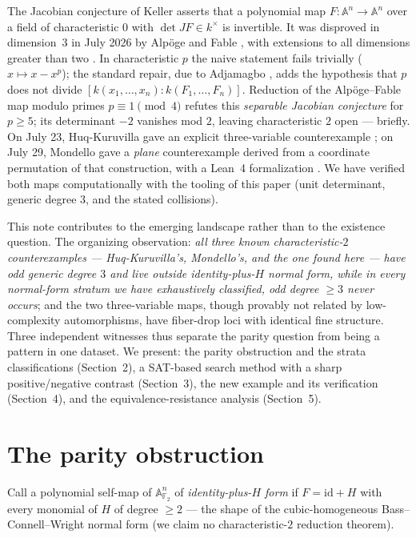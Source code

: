 \documentclass[11pt]{amsart}
\newcommand{\F}{\mathbb{F}}
\newcommand{\A}{\mathbb{A}}
\begin{document}
The Jacobian conjecture of Keller asserts that a polynomial map
$F\colon\A^n \to \A^n$ over a field of characteristic $0$ with
$\det JF \in k^\times$ is invertible. It was disproved in dimension~$3$
in July 2026 by Alp\"oge and Fable \cite{alpoge,sbs,tao}, with
extensions to all dimensions greater than two \cite{dims}. In
characteristic $p$ the naive statement fails trivially
($x \mapsto x - x^p$); the standard repair, due to Adjamagbo
\cite{adjamagbo}, adds the hypothesis that $p$ does not divide
$[k(x_1,\dots,x_n) : k(F_1,\dots,F_n)]$. Reduction of the
Alp\"oge--Fable map modulo primes $p \equiv 1 \pmod 4$ refutes this
\emph{separable Jacobian conjecture} for $p \ge 5$; its determinant
$-2$ vanishes mod $2$, leaving characteristic $2$ open --- briefly. On
July 23, Huq-Kuruvilla gave an explicit three-variable counterexample
\cite{hk}; on July 29, Mondello gave a \emph{plane} counterexample
derived from a coordinate permutation of that construction, with a
Lean~4 formalization \cite{mondello}. We have verified both maps
computationally with the tooling of this paper (unit determinant,
generic degree $3$, and the stated collisions).

This note contributes to the emerging landscape rather than to the
existence question. The organizing observation: \emph{all three known
characteristic-$2$ counterexamples --- Huq-Kuruvilla's, Mondello's, and
the one found here --- have odd generic degree $3$ and live outside
identity-plus-$H$ normal form, while in every normal-form stratum we
have exhaustively classified, odd degree $\ge 3$ never occurs}; and the
two three-variable maps, though provably not related by low-complexity
automorphisms, have fiber-drop loci with identical fine structure.
Three independent witnesses thus separate the parity question from
being a pattern in one dataset. We present: the parity obstruction and
the strata classifications (Section~2), a SAT-based search method with
a sharp positive/negative contrast (Section~3), the new example and its
verification (Section~4), and the equivalence-resistance analysis
(Section~5).

\section{The parity obstruction}

Call a polynomial self-map of $\A^n_{\F_2}$ of \emph{identity-plus-$H$
form} if $F = \mathrm{id} + H$ with every monomial of $H$ of degree
$\ge 2$ --- the shape of the cubic-homogeneous Bass--Connell--Wright
normal form \cite{bcw} (we claim no characteristic-$2$ reduction
theorem).
\end{document}
